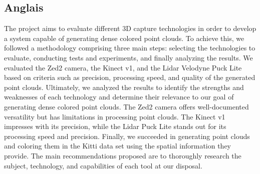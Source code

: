 \subsection{Anglais}
    \normalsize{
        The project aims to evaluate different 3D capture technologies in order to develop a system capable of generating dense colored point clouds. To achieve this, we followed a methodology comprising three main steps: selecting the technologies to evaluate, conducting tests and experiments, and finally analyzing the results. We evaluated the Zed2 camera, the Kinect v1, and the Lidar Velodyne Puck Lite based on criteria such as precision, processing speed, and quality of the generated point clouds. Ultimately, we analyzed the results to identify the strengths and weaknesses of each technology and determine their relevance to our goal of generating dense colored point clouds. The Zed2 camera offers well-documented versatility but has limitations in processing point clouds. The Kinect v1 impresses with its precision, while the Lidar Puck Lite stands out for its processing speed and precision. Finally, we succeeded in generating point clouds and coloring them in the Kitti data set using the spatial information they provide. The main recommendations proposed are to thoroughly research the subject, technology, and capabilities of each tool at our disposal.
    }

\clearpage